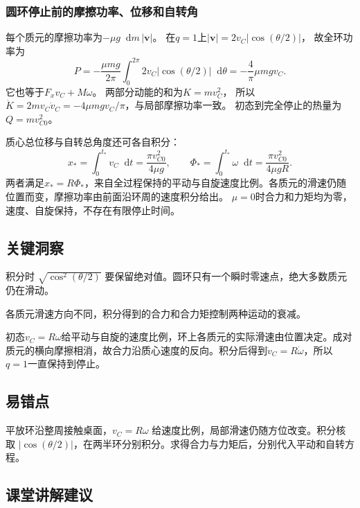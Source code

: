 \documentclass[UTF8,fontset=fandol,a4paper,11pt]{ctexart}
\newcommand{\dd}{\mathop{}\!\mathrm{d}}
\begin{document}
\subsubsection*{圆环停止前的摩擦功率、位移和自转角}
每个质元的摩擦功率为$-\mu g\dd m\,|\boldsymbol v|$。
在$q=1$上$|\boldsymbol v|=2v_C|\cos(\theta/2)|$，
故全环功率为
\[
P=-\frac{\mu mg}{2\pi}\int_0^{2\pi}2v_C|\cos(\theta/2)|\dd\theta
=-\frac4\pi\mu mgv_C.
\]
它也等于$F_xv_C+M\omega$。
两部分动能的和为$K=mv_C^2$，
所以$\dot K=2mv_C\dot v_C=-4\mu mgv_C/\pi$，与局部摩擦功率一致。
初态到完全停止的热量为$Q=mv_{C0}^2$。

质心总位移与自转总角度还可各自积分：
\[
x_* =\int_0^{t_*}v_C\dd t=\frac{\pi v_{C0}^2}{4\mu g},
\qquad
\Phi_* =\int_0^{t_*}\omega\dd t=\frac{\pi v_{C0}^2}{4\mu gR}.
\]
两者满足$x_*=R\Phi_*$，来自全过程保持的平动与自旋速度比例。各质元的滑速仍随位置而变，摩擦功率由前面沿环周的速度积分给出。
$\mu=0$时合力和力矩均为零，速度、自旋保持，不存在有限停止时间。




\subsection*{关键洞察}

积分时 $\sqrt{\cos^2(\theta/2)}$ 要保留绝对值。圆环只有一个瞬时零速点，绝大多数质元仍在滑动。

各质元滑速方向不同，积分得到的合力和合力矩控制两种运动的衰减。

初态\(v_C=R\omega\)给平动与自旋的速度比例，环上各质元的实际滑速由位置决定。成对质元的横向摩擦相消，故合力沿质心速度的反向。积分后得到\(\dot v_C=R\dot\omega\)，所以\(q=1\)一直保持到停止。



\subsection*{易错点}

平放环沿整周接触桌面，$v_C=R\omega$ 给速度比例，局部滑速仍随方位改变。积分核取 $|\cos(\theta/2)|$，在两半环分别积分。求得合力与力矩后，分别代入平动和自转方程。



\subsection*{课堂讲解建议}
\end{document}
